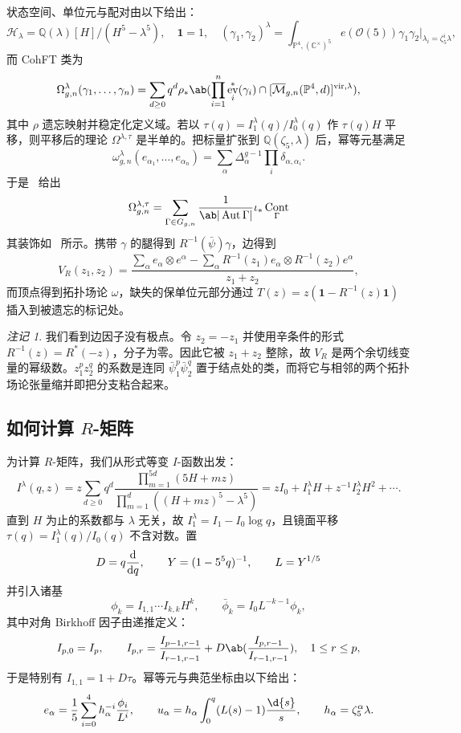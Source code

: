 \documentclass{amsart}
\theoremstyle{definition}
\theoremstyle{remark}
\newtheorem{rmk}[thm]{注记}
\theoremstyle{plain}
\theoremstyle{definition}
\theoremstyle{remark}
\newcommand{\C}{\mathbb{C}}
\newcommand{\Q}{\mathbb{Q}}
\renewcommand{\P}{\mathbb{P}}
\newcommand{\Mbar}{\overline{\mathcal{M}}}
\newcommand{\mc}[1]{\mathcal{#1}}
\newcommand{\mr}[1]{\mathrm{#1}}
\newcommand{\1}{\mathbf{1}}
\newcommand{\2}{\mathbf{2}}
\newcommand{\3}{\mathbf{3}}
\newcommand{\vir}{\mr{vir}}
\DeclareMathOperator{\Aut}{Aut}
\DeclareMathOperator{\ev}{ev}
\DeclareMathOperator{\Cont}{Cont}
\begin{document}
状态空间、单位元与配对由以下给出：
\[ \mc{H}_{\lambda} = \Q(\lambda)[H]/(H^5-\lambda^5), \quad \1 = 1, \quad (\gamma_1,\gamma_2)^{\lambda} = \int_{\P^4, (\C^{\times})^5} e(\mc{O}(5))\gamma_1\gamma_2 \Big|_{\lambda_i = \zeta_5^i\lambda}, \]
而 CohFT 类为
\[ \Omega^{\lambda}_{g,n}(\gamma_1, \ldots, \gamma_n) = \sum_{d \geq 0} q^d \rho_* \ab( \prod_{i=1}^n \ev_i^*(\gamma_i) \cap [\Mbar_{g,n}(\P^4,d)]^{\vir,\lambda}), \]
其中 \(\rho\) 遗忘映射并稳定化定义域。若以 \(\tau(q) = I^{\lambda}_1(q)/I^{\lambda}_0(q)\) 作 \(\tau(q)H\) 平移，则平移后的理论 \(\Omega^{\lambda,\tau}\) 是半单的。把标量扩张到 \(\Q(\zeta_5,\lambda)\) 后，幂等元基满足
\[ \omega^{\lambda}_{g,n}(e_{\alpha_1}, \ldots, e_{\alpha_n}) = \sum_{\alpha}\Delta_{\alpha}^{g-1}\prod_i \delta_{\alpha,\alpha_i}. \]
于是~ 给出
\[ \Omega^{\lambda,\tau}_{g,n} = \sum_{\Gamma \in G_{g,n}} \frac{1}{\ab|\Aut\Gamma|}\iota_* \Cont_{\Gamma} \]
其装饰如~ 所示。携带 \(\gamma\) 的腿得到 \(R^{-1}(\bar{\psi})\gamma\)，边得到
\[ V_R(z_1,z_2) = \frac{\sum_{\alpha} e_{\alpha}\otimes e^{\alpha} - \sum_{\alpha} R^{-1}(z_1)e_{\alpha} \otimes R^{-1}(z_2)e^{\alpha}}{z_1+z_2}, \]
而顶点得到拓扑场论 \(\omega\)，缺失的保单位元部分通过 \(T(z) = z(\1 - R^{-1}(z)\1)\) 插入到被遗忘的标记处。

\begin{rmk}
    我们看到边因子没有极点。令 \(z_2 = -z_1\) 并使用辛条件的形式 \(R^{-1}(z) = R^*(-z)\)，分子为零。因此它被 \(z_1+z_2\) 整除，故 \(V_R\) 是两个余切线变量的幂级数。\(z_1^p z_2^q\) 的系数是连同 \(\bar{\psi}_1^p \bar{\psi}_2^q\) 置于结点处的类，而将它与相邻的两个拓扑场论张量缩并即把分支粘合起来。
\end{rmk}

\subsection{如何计算 \(R\)-矩阵}%
\label{sub:How to compute the R-matrix (Guo)}

为计算 \(R\)-矩阵，我们从形式等变 \(I\)-函数出发：
\[ I^{\lambda}(q,z) = z\sum_{d\geq0}q^d \frac{\prod_{m=1}^{5d}(5H+mz)}{\prod_{m=1}^d ((H+mz)^5 - \lambda^5)} = zI_0 + I_1^{\lambda}H + z^{-1}I_2^{\lambda}H^2 + \cdots. \]
直到 \(H\) 为止的系数都与 \(\lambda\) 无关，故 \(I_1^{\lambda} = I_1 - I_0 \log q\)，且镜面平移 \(\tau(q) = I_1^{\lambda}(q)/I_0(q)\) 不含对数。置
\[ D = q\odv{}{q}, \qquad Y = (1-5^5q)^{-1}, \qquad L = Y^{1/5} \]
并引入诸基
\[ \phi_k = I_{1,1}\cdots I_{k,k}H^k, \qquad \bar{\phi}_k = I_0 L^{-k-1}\phi_k, \]
其中对角 Birkhoff 因子由递推定义：
\[ I_{p,0} = I_p, \qquad I_{p,r} = \frac{I_{p-1,r-1}}{I_{r-1,r-1}} + D \ab( \frac{I_{p,r-1}}{I_{r-1,r-1}}), \quad 1 \leq r \leq p, \]
于是特别有 \(I_{1,1} = 1+D\tau\)。幂等元与典范坐标由以下给出：
\[ e_{\alpha} = \frac{1}{5}\sum_{i=0}^4 h_{\alpha}^{-i}\frac{\phi_i}{L^i}, \qquad u_{\alpha} = h_{\alpha}\int_0^q (L(s)-1)\frac{\d{s}}{s}, \qquad h_{\alpha} = \zeta_5^{\alpha}\lambda. \]
\end{document}
